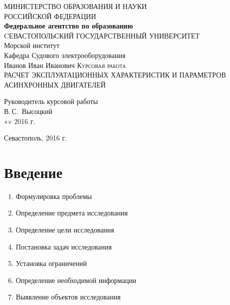 \documentclass[12pt,a4paper]{scrartcl}
\begin{document}
\begin{titlepage}
  \begin{center}
    \large
    МИНИСТЕРСТВО ОБРАЗОВАНИЯ И НАУКИ\\ РОССИЙСКОЙ ФЕДЕРАЦИИ\\
    \textbf{Федеральное агентство по образованию\\}
    \vspace{0.5cm}
    CЕВАСТОПОЛЬСКИЙ ГОСУДАРСТВЕННЫЙ УНИВЕРСИТЕТ\\
    \vspace{0.25cm}
    Морской институт\\
    Кафедра Судового электрооборудования\\
    \vfill
    Иванов Иван Иванович
    \vfill
    \textsc{Курсовая работа}\\[5mm]
    {\LARGE РАСЧЕТ  ЭКСПЛУАТАЦИОННЫХ ХАРАКТЕРИСТИК И ПАРАМЕТРОВ   АСИНХРОННЫХ ДВИГАТЕЛЕЙ\\}
  \bigskip
\end{center}
\vfill
\newlength{\ML}
\hfill\begin{minipage}{0.5\textwidth}
  Руководитель курсовой работы\\
  \underline{\hspace{\ML}} В.\,С.~Высоцкий\\
  «\underline{\hspace{0.7cm}}» \underline{\hspace{2cm}} 2016 г.
\end{minipage}%
\bigskip
\bigskip
\begin{center}
  Севастополь, 2016 г.
\end{center}
\end{titlepage}
\section*{Введение}
\label{sec:intro}
\begin{enumerate}
 \item Формулировка проблемы
 \item Определение предмета исследования
 \item Определение цели исследования
 \item Постановка задач исследования
 \item Установка ограничений
 \item Определение необходимой информации
 \item Выявление объектов исследования
\end{enumerate}
\end{document}
